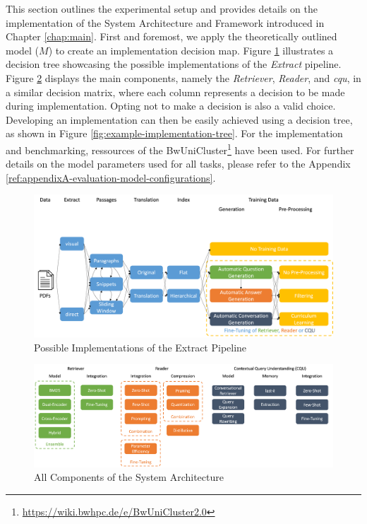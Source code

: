 This section outlines the experimental setup and provides details on the implementation of the System Architecture and Framework introduced in Chapter \ref{chap:main}. First and foremost, we apply the theoretically outlined model ($M$) to create an implementation decision map. Figure \ref{fig:extract-pipeline-implementation-grid} illustrates a decision tree showcasing the possible implementations of the \textit{Extract} pipeline. Figure \ref{fig:all-components-conrag-grid} displays the main components, namely the \textit{Retriever}, \textit{Reader}, and \textit{\gls{cqu}}, in a similar decision matrix, where each column represents a decision to be made during implementation. Opting not to make a decision is also a valid choice. Developing an implementation can then be easily achieved using a decision tree, as shown in Figure \ref{fig:example-implementation-tree}. For the implementation and benchmarking, ressources of the BwUniCluster\footnote{\url{https://wiki.bwhpc.de/e/BwUniCluster2.0}} have been used. For further details on the model parameters used for all tasks, please refer to the Appendix \ref{ref:appendixA-evaluation-model-configurations}.

\begin{figure}
    \centering
    \includegraphics[width=\textwidth]{Grafiken/extract_pipeline.png}
    \caption{Possible Implementations of the Extract Pipeline}
    \label{fig:extract-pipeline-implementation-grid}
\end{figure}

\begin{figure}
    \centering
    \includegraphics[width=\textwidth]{Grafiken/all_components_conrag.png}
    \caption{All Components of the System Architecture}
    \label{fig:all-components-conrag-grid}
\end{figure}

